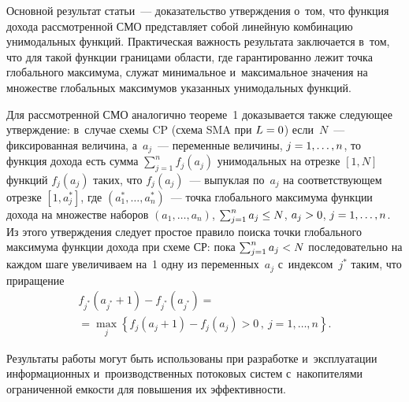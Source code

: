 \begin{multicols}{2}
  Основной результат статьи~--- доказательство утверж\-де\-ния о~том, что 
функция дохода рас\-смот\-рен\-ной СМО пред\-став\-ля\-ет собой линейную 
комбинацию унимодальных функций. Прак\-ти\-че\-ская важ\-ность результата 
заключается в~том, что для такой функции границами об\-ласти, где 
гарантированно лежит точ\-ка глобального максимума, служат минимальное 
и~максимальное значения на множестве глобальных максимумов указанных 
унимодальных функций. 
  

  Для рассмотренной СМО аналогично тео\-ре\-ме~1 доказывается так\-же 
сле\-ду\-ющее утверж\-де\-ние: в~случае схемы CP (схема SMA при $L\hm=0$) 
если~$N$~--- фиксированная величина, а~$a_j$~--- переменные величины, 
$j\hm= 1, \ldots , n$, то функция дохода есть сумма $\sum\nolimits^n_{j=1} 
f_j(a_j)$ унимодальных на отрезке $[1,N]$ функций $f_j(a_j)$ таких, что 
$f_j(a_j)$~--- вы\-пук\-лая по~$a_j$ на со\-от\-вет\-ст\-ву\-ющем отрезке $[1,a_j^*]$, где 
$(a_1^*, \ldots , a_n^*)$~--- точ\-ка глобального максимума функции дохода на 
множестве наборов $(a_1, \ldots , a_n)$, $\sum\nolimits^n_{j=1} a_j \hm\leq N$, 
$a_j\hm> 0$, $j\hm=1, \ldots , n$. Из этого утверж\-де\-ния следует прос\-тое правило 
поиска точ\-ки глобального максимума функции дохода при схеме СР: пока 
$\sum\nolimits^n_{j=1} a_j\hm<N$ по\-сле\-до\-ва\-тель\-но на каж\-дом шаге 
увеличиваем на~1 одну из переменных~$a_j$ с~индексом~$j^*$ таким, что 
при\-ра\-щение 
 \begin{multline*}
  f_{j^*} \left( a_{j^*}+1\right) - f_{j^*}\left(a_{j^*}\right) ={}\\
  {}=\max\limits_j \left\{ 
f_j\left( a_j+1\right) -f_j\left(a_j\right)>0\,,\ j=1,\ldots , n\right\}.
  \end{multline*}
  
  Результаты работы могут быть использованы при разработке и~эксплуатации 
информационных и~производственных потоковых сис\-тем с~накопителями 
ограниченной ем\-кости для повышения их эф\-фек\-тив\-ности. 

\vspace*{-6pt}
  

\end{multicols}

